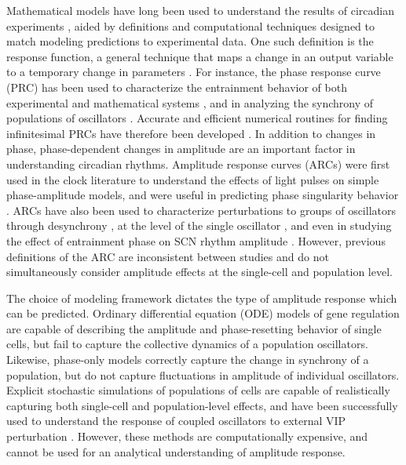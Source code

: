 \documentclass[11pt, letterpaper]{article}
\begin{document}
Mathematical models have long been used to understand the results of circadian experiments \cite{Leloup2003, Becker-Weimann2004}, aided by definitions and computational techniques designed to match modeling predictions to experimental data.
One such definition is the response function, a general technique that maps a change in an output variable to a temporary change in parameters \cite{Rand2004}.
For instance, the phase response curve (PRC) has been used to characterize the entrainment behavior of both experimental and mathematical systems \cite{Daan1976, Taylor2008, Pfeuty2011}, and in analyzing the synchrony of populations of oscillators \cite{Kim2014}.
Accurate and efficient numerical routines for finding infinitesimal PRCs have therefore been developed \cite{Kramer1984, Gunawan2006, Taylor2008a}.
In addition to changes in phase, phase-dependent changes in amplitude are an important factor in understanding circadian rhythms.
Amplitude response curves (ARCs) were first used in the clock literature to understand the effects of light pulses on simple phase-amplitude models, and were useful in predicting phase singularity behavior \cite{Jewett1998}.
ARCs have also been used to characterize perturbations to groups of oscillators through desynchrony \cite{Achermann1999, Ukai2007}, at the level of the single oscillator \cite{VanderVeen2012, Castejon2013}, and even in studying the effect of entrainment phase on SCN rhythm amplitude \cite{VanOosterhout2012}.
However, previous definitions of the ARC are inconsistent between studies and do not simultaneously consider amplitude effects at the single-cell and population level.

The choice of modeling framework dictates the type of amplitude response which can be predicted.
Ordinary differential equation (ODE) models of gene regulation are capable of describing the amplitude and phase-resetting behavior of single cells, but fail to capture the collective dynamics of a population oscillators.
Likewise, phase-only models correctly capture the change in synchrony of a population, but do not capture fluctuations in amplitude of individual oscillators.
Explicit stochastic simulations of populations of cells are capable of realistically capturing both single-cell and population-level effects, and have been successfully used to understand the response of coupled oscillators to external VIP perturbation \cite{An2013}.
However, these methods are computationally expensive, and cannot be used for an analytical understanding of amplitude response.
\end{document}
